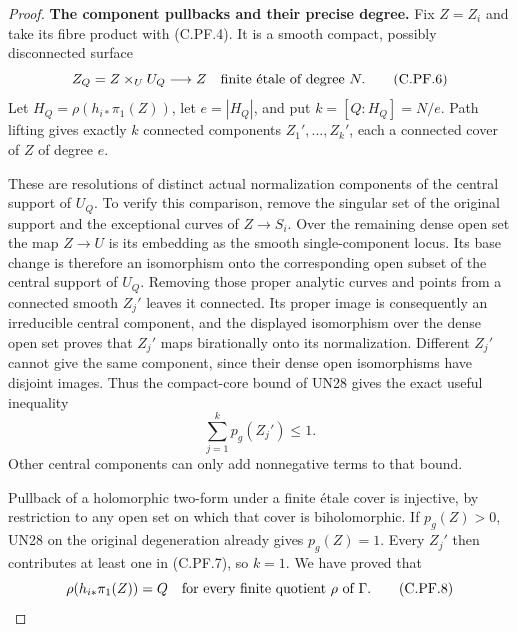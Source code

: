 \begin{proof}
\par\medskip\noindent\textbf{The component pullbacks and their precise degree.}
Fix $Z=Z_i$ and take its fibre product with (C.PF.4). It is a
smooth compact, possibly disconnected surface
\[
               Z_Q=Z\times_U U_Q\longrightarrow Z
                       \quad\hbox{finite \'{e}tale of degree }N .
                                                        \tag{C.PF.6}
\]
Let $H_Q=\rho(h_{i*}\pi_1(Z))$, let $e=|H_Q|$, and put
$k=[Q:H_Q]=N/e$. Path lifting gives exactly $k$ connected
components $Z_1',\ldots,Z_k'$, each a connected cover of $Z$
of degree $e$.

These are resolutions of distinct actual normalization components
of the central support of $U_Q$. To verify this comparison, remove
the singular set of the original support and the exceptional
curves of $Z\to S_i$. Over the remaining dense open set the map
$Z\to U$ is its embedding as the smooth single-component locus.
Its base change is therefore an isomorphism onto the corresponding
open subset of the central support of $U_Q$. Removing those proper
analytic curves and points from a connected smooth $Z_j'$ leaves
it connected. Its proper image is consequently an irreducible
central component, and the displayed isomorphism over the dense
open set proves that $Z_j'$ maps birationally onto its normalization.
Different $Z_j'$ cannot give the same component, since their dense
open isomorphisms have disjoint images. Thus the compact-core
bound of UN28 gives the exact useful inequality
\[
                         \sum_{j=1}^k p_g(Z_j')\le1 .
                                                        \tag{C.PF.7}
\]
Other central components can only add nonnegative terms to that
bound.

Pullback of a holomorphic two-form under a finite \'{e}tale
cover is injective, by restriction to any open set on which
that cover is biholomorphic. If $p_g(Z)>0$, UN28 on the
original degeneration already gives $p_g(Z)=1$. Every
$Z_j'$ then contributes at least one in (C.PF.7), so $k=1$.
We have proved that
\[
       \rho(h_{i*}\pi_1(Z))=Q
                 \quad\hbox{for every finite quotient }\rho
                         \hbox{ of }\Gamma .           \tag{C.PF.8}
\]


\end{proof}
